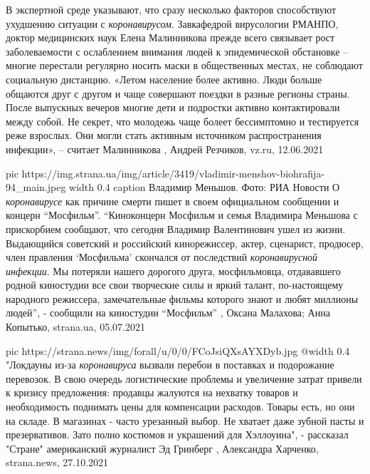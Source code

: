В экспертной среде указывают, что сразу несколько факторов способствуют
ухудшению ситуации с \emph{коронавирусом}. Завкафедрой вирусологии РМАНПО,
доктор медицинских наук Елена Малинникова прежде всего связывает рост
заболеваемости с ослаблением внимания людей к эпидемической обстановке – многие
перестали регулярно носить маски в общественных местах, не соблюдают социальную
дистанцию. «Летом население более активно. Люди больше общаются друг с другом и
чаще совершают поездки в разные регионы страны. После выпускных вечеров многие
дети и подростки активно контактировали между собой. Не секрет, что молодежь
чаще болеет бессимптомно и тестируется реже взрослых. Они могли стать активным
источником распространения инфекции», – считает Малинникова
, Андрей Резчиков, vz.ru, 12.06.2021

\ifcmt
  pic https://img.strana.ua/img/article/3419/vladimir-menshov-biohrafija-94_main.jpeg
	width 0.4
	caption Владимир Меньшов. Фото: РИА Новости 
\fi
О \emph{коронавирусе} как причине смерти пишет в своем официальном сообщении и
концерн \enquote{Мосфильм}. \enquote{Киноконцерн Мосфильм и семья
Владимира Меньшова с прискорбием сообщают, что сегодня Владимир Валентинович
ушел из жизни. Выдающийся советский и российский кинорежиссер, актер,
сценарист, продюсер, член правления \enquote{Мосфильма} скончался от
последствий \emph{коронавирусной инфекции}. Мы потеряли нашего дорогого друга,
мосфильмовца, отдававшего родной киностудии все свои творческие силы и яркий
талант, по-настоящему народного режиссера, замечательные фильмы которого знают
и любят миллионы людей}, - сообщили на киностудии \enquote{Мосфильм}
, 
Оксана Малахова; Анна Копытько, strana.ua, 05.07.2021

\ifcmt
  pic https://strana.news/img/forall/u/0/0/FCoJsiQXsAYXDyb.jpg
  @width 0.4
\fi
"Локдауны из-за \emph{коронавируса} вызвали перебои в поставках и подорожание
перевозок. В свою очередь логистические проблемы и увеличение затрат привели к
кризису предложения: продавцы жалуются на нехватку товаров и необходимость
поднимать цены для компенсации расходов. Товары есть, но они на складе. В
магазинах - часто урезанный выбор. Не хватает даже зубной пасты и
презервативов. Зато полно костюмов и украшений для Хэллоуина", - рассказал
"Стране" американский журналист Эд Гринберг
, 
Александра Харченко, strana.news, 27.10.2021
